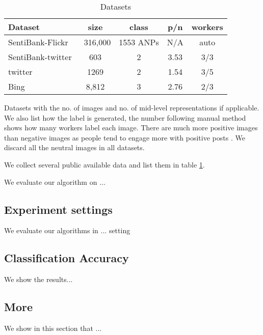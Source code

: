 \begin{table}
		\vspace{-0.5cm}
		\caption{Datasets}
		\label{table:datasets}
		\begin{threeparttable}
			\centering
			\begin{tabular}{l|cccc} \hline
				Dataset & size & class & p/n & workers \\ \hline
				SentiBank-Flickr \cite{borth2013large} & ~316,000 & 1553 ANPs & N/A & auto \\ 
				SentiBank-twitter \cite{borth2013large} & 603 & 2 & 3.53 & 3/3 \\
				twitter \cite{you2015robust} & 1269 & 2 & 1.54 & 3/5\\
				Bing \cite{ahsan2017towards} & 8,812 & 3 & 2.76 & 2/3 \\ \hline
			\end{tabular}
			\begin{tablenotes}
				\item Datasets with the no. of images and no. of mid-level representations if applicable. We also list how the label is generated, the number following manual method shows how many workers label each image. There are much more positive images than negative images as people tend to engage more with positive posts \cite{kramer2014experimental}. We discard all the neutral images in all datasets.
			\end{tablenotes}
		\end{threeparttable}
		\vspace{-0.3cm}
\end{table}

We collect several public available data and list them in table \ref{table:datasets}. 

We evaluate our algorithm on ...

\subsection{Experiment settings}
\label{eval_system}

We evaluate our algorithms in ... setting

\subsection{Classification Accuracy}
\label{eval_accuracy}

We show the results...

\subsection{More}
\label{eval_more}


We show in this section that ...

